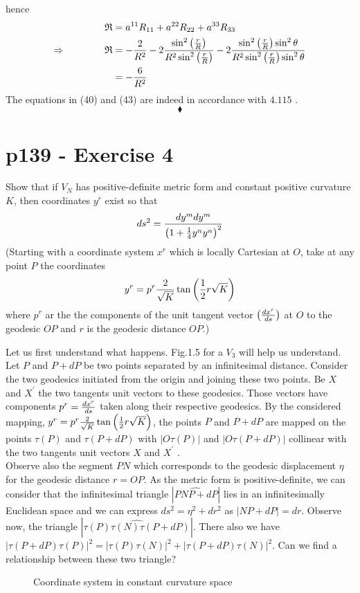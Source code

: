 hence
\begin{align}
\mathfrak{R}&=a^{11}R_{11}+a^{22}R_{22}+a^{33}R_{33}\\
\Rightarrow\quad\quad\quad\quad \mathfrak{R}&= -\frac{2}{R^2}-2\frac{\sin^2\left(\frac{r}{R}\right)}{R^2\sin^2\left(\frac{r}{R}\right)}-2\frac{\sin^2\left(\frac{r}{R}\right)\sin^2\theta}{R^2\sin^2\left(\frac{r}{R}\right)\sin^2\theta }\\
&= -\frac{6}{R^2}
\end{align}
The equations in (40) and (43) are indeed in accordance with $\mathbf{4.115}$ .
$$\blacklozenge$$
\newpage

\section{p139 - Exercise 4}
\begin{tcolorbox}
Show that if $V_N$ has positive-definite metric form and constant positive curvature $K$, then coordinates $y^r$ exist so that
$$ds^2=\frac{dy^m dy^m}{\left(1+\frac{1}{4} y^n y^n\right)^2}$$
(Starting with a coordinate system $x^r$ which is locally Cartesian at $O$, take at any point $P$ the coordinates
$$y^r=p^r\frac{2}{\sqrt{K}}\tan\left(\frac{1}{2} r \sqrt{K}\right)$$
where $p^r$ ar the the components of the unit tangent vector $\left(\dv{x^r}{s}\right)$ at $O$ to the geodesic $OP$ and $r$ is the geodesic distance $OP$.)
\end{tcolorbox}
Let us first understand what happens. Fig.1.5 for a $V_3$ will help us understand.
Let $P$ and $P+dP$ be two points separated by an infinitesimal distance. Consider the two geodesics initiated from the origin and joining these two points. Be $X$ and $X^{'}$ the two tangents unit vectors  to these geodesics. Those vectors have components $p^r=\dv{x^r}{s}$ taken along their respective geodesics.  By the considered mapping, $y^r=p^r\frac{2}{\sqrt{K}}\tan\left(\frac{1}{2} r \sqrt{K}\right)$, the points $P$ and $P+dP$ are mapped on the  points  $\tau (P)$ and $\tau (P+dP)$ with $\left|O\tau (P)\right|$ and $\left|O\tau (P+dP)\right|$ collinear with the  two tangents unit vectors  $X$ and $X^{'}$ . \\
Observe also the segment $PN$ which corresponds to the geodesic displacement $\eta$ for the geodesic distance $r=OP$. As the metric form is positive-definite, we can consider that the infinitesimal triangle $\left|\widehat{PNP+dP}\right|$ lies in an infinitesimally Euclidean space and  we can express $ds^2=\eta^2+ dr^2$ as $\left|NP+dP\right| = dr$. Observe now, the triangle $\left|\widehat{\tau(P)\tau(N)\tau(P+dP)}\right|$. There also we have $\left|\tau(P+dP)\tau(P)\right|^2 = \left|\tau(P)\tau(N)\right|^2+\left|\tau(P+dP)\tau(N)\right|^2$. Can we find a relationship between these two triangle?\\
\begin{figure}[H]
\begin{center}

\caption{Coordinate system in constant curvature space}
\label{fig:fig_p139_Ex4}
\end{center}
\end{figure}

